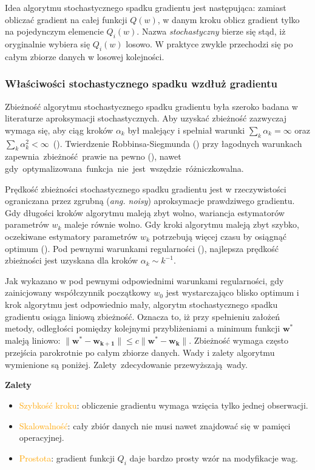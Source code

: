 Idea algorytmu stochastycznego spadku gradientu jest następująca: zamiast obliczać gradient na całej funkcji $Q(w)$, w danym kroku oblicz
gradient tylko na pojedynczym elemencie $Q_{i}(w)$. Nazwa \textit{stochastyczny} bierze się stąd, iż oryginalnie wybiera
się $Q_{i}(w)$ losowo. W praktyce zwykle przechodzi się po całym zbiorze danych w losowej kolejności.
\subsubsection{Właściwości stochastycznego spadku wzdłuż gradientu}
Zbieżność algorytmu stochastycznego spadku gradientu była szeroko badana w literaturze aproksymacji stochastycznych. Aby uzyskać zbieżność zazwyczaj wymaga się, aby ciąg kroków $\alpha_k$ był malejący i spełniał warunki $\sum\nolimits_k \alpha_k = \infty$ oraz $\sum\nolimits_k \alpha_k^2 < \infty$~(\cite{bott1}).
Twierdzenie Robbinsa-Siegmunda (\cite{robbins}) przy łagodnych warunkach zapewnia~zbieżność~prawie na pewno (\cite{bottDOD}), nawet  gdy~optymalizowana~funkcja~nie~jest~wszędzie~różniczkowalna.

Prędkość zbieżności stochastycznego spadku gradientu jest w rzeczywistości ograniczana przez zgrubną (\textit{ang. noisy}) aproksymacje prawdziwego gradientu. Gdy długości kroków algorytmu
maleją zbyt wolno, wariancja estymatorów parametrów $w_k$ maleje równie wolno. Gdy kroki algorytmu maleją
zbyt szybko, oczekiwane estymatory parametrów $w_k$ potrzebują więcej czasu by osiągnąć optimum (\cite{bott1}). Pod pewnymi warunkami regularności (\cite{murata}), najlepsza prędkość zbieżności jest uzyskana dla kroków $\alpha_k\sim k^{-1}$.

Jak wykazano w \cite{dennis} pod pewnymi odpowiednimi warunkami regularności, gdy zainicjowany współczynnik początkowy $w_0$ jest wystarczająco blisko optimum i krok algorytmu jest odpowiednio mały, algorytm stochastycznego spadku gradientu osiąga liniową zbieżność. Oznacza to, iż przy spełnieniu założeń metody, odległości pomiędzy kolejnymi przybliżeniami a minimum funkcji $\mathbf{w^{\ast}}$ maleją liniowo: $\parallel \mathbf{w^{\ast}} - \mathbf{w_{k+1}} \parallel \leqslant c \parallel \mathbf{w^{\ast}} - \mathbf{w_k} \parallel$. Zbieżność wymaga często przejścia parokrotnie po całym
zbiorze danych. Wady i zalety algorytmu wymienione są poniżej. Zalety~zdecydowanie przewyższają~wady.

\textbf{Zalety} \vspace{-5pt}
\begin{itemize}
\item \textcolor{orange}{Szybkość kroku}: obliczenie gradientu wymaga wzięcia tylko jednej
obserwacji.
\item \textcolor{orange}{Skalowalność}: cały zbiór danych nie musi nawet znajdować się
w pamięci operacyjnej.
\item \textcolor{orange}{Prostota}: gradient funkcji  $Q_{i}$ daje bardzo prosty wzór na
modyfikacje wag.
\end{itemize}


